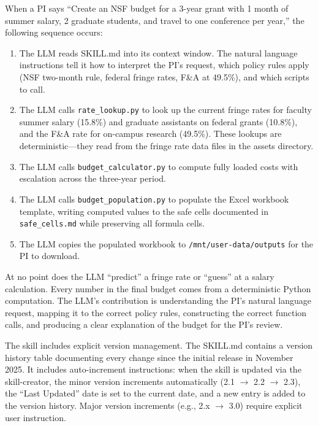 \documentclass[12pt]{article}
\begin{document}
When a PI says ``Create an NSF budget for a 3-year grant with 1 month of summer salary, 2 graduate students, and travel to one conference per year,'' the following sequence occurs:
\begin{enumerate}
\item The LLM reads SKILL.md into its context window. The natural language instructions tell it how to interpret the PI's request, which policy rules apply (NSF two-month rule, federal fringe rates, F\&A at 49.5\%), and which scripts to call.

\item The LLM calls \texttt{rate\_lookup.py} to look up the current fringe rates for faculty summer salary (15.8\%) and graduate assistants on federal grants (10.8\%), and the F\&A rate for on-campus research (49.5\%). These lookups are deterministic---they read from the fringe rate data files in the assets directory.

\item The LLM calls \texttt{budget\_calculator.py} to compute fully loaded costs with escalation across the three-year period.

\item The LLM calls \texttt{budget\_population.py} to populate the Excel workbook template, writing computed values to the safe cells documented in \texttt{safe\_cells.md} while preserving all formula cells.

\item The LLM copies the populated workbook to \texttt{/mnt/user-data/outputs} for the PI to download.
\end{enumerate}
At no point does the LLM ``predict'' a fringe rate or ``guess'' at a salary calculation. Every number in the final budget comes from a deterministic Python computation. The LLM's contribution is understanding the PI's natural language request, mapping it to the correct policy rules, constructing the correct function calls, and producing a clear explanation of the budget for the PI's review.

The skill includes explicit version management. The SKILL.md contains a version history table documenting every change since the initial release in November 2025. It includes auto-increment instructions: when the skill is updated via the skill-creator, the minor version increments automatically (2.1 $\to$ 2.2 $\to$ 2.3), the ``Last Updated'' date is set to the current date, and a new entry is added to the version history. Major version increments (e.g., 2.x $\to$ 3.0) require explicit user instruction.
\end{document}
